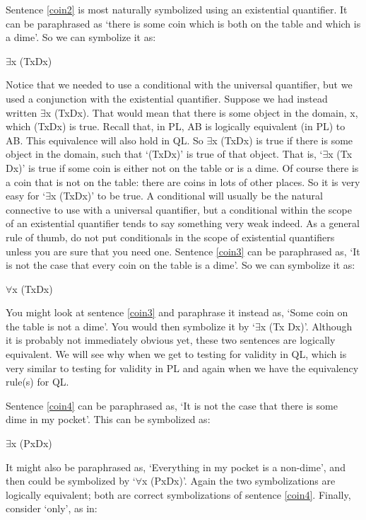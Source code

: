 Sentence \ref{coin2} is most naturally symbolized using an existential quantifier. It can be paraphrased as ‘there is some coin which is both on the table and which is a dime’. So we can symbolize it as:
\begin{center}
$\exists$x (Tx\eand Dx)
\end{center}
Notice that we needed to use a conditional with the universal quantifier, but we used a conjunction with the existential quantifier. Suppose we had instead written $\exists$x (Tx\eif Dx). That would mean that there is some object in the domain, x, which (Tx\eif  Dx) is true. Recall that, in PL, A\eif B is logically equivalent (in PL) to \enot A\eor B. This equivalence will also hold in QL. So $\exists$x (Tx\eif  Dx) is true if there is some object in the domain, such that ‘(\enot Tx\eor  Dx)’ is true of that object. That is, ‘$\exists$x (Tx \eif  Dx)’ is true if some coin is either not on the table or is a dime. Of course there is a coin that is not on the table: there are coins in lots of other places. So it is very easy for ‘$\exists$x (Tx\eif  Dx)’ to be true. A conditional will usually be the natural connective to use with a universal quantifier, but a conditional within the scope of an existential quantifier tends to say something very weak indeed. As a general rule of thumb, do not put conditionals in the scope of existential quantifiers unless you are sure that you need one.
Sentence \ref{coin3} can be paraphrased as, ‘It is not the case that every coin on the table is a dime’. So we can symbolize it as:
\begin{center}
\enot $\forall$x (Tx\eif Dx)
\end{center}
You might look at sentence \ref{coin3} and paraphrase it instead as, ‘Some coin on the table is not a dime’. You would then symbolize it by ‘$\exists$x (Tx \eand  \enot Dx)’. Although it is probably not immediately obvious yet, these two sentences are logically equivalent. We will see why when we get to testing for validity in QL, which is very similar to testing for validity in PL and again when we have the equivalency rule(s) for QL.

Sentence \ref{coin4} can be paraphrased as, ‘It is not the case that there is some dime in my pocket’. This can be symbolized as:
\begin{center}
\enot $\exists$x (Px\eand Dx)
\end{center}
It might also be paraphrased as, ‘Everything in my pocket is a non-dime’, and then could be symbolized by ‘$\forall$x (Px\eif  \enot Dx)’. Again the two symbolizations are logically equivalent; both are correct symbolizations of sentence \ref{coin4}.
Finally, consider ‘only’, as in:

